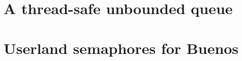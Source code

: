 \documentclass[11pt]{article}
\begin{document}

\clearpage
\maketitle
\thispagestyle{empty}

\newpage




\section{A thread-safe unbounded queue}
\section{Userland semaphores for Buenos}
\end{document}
